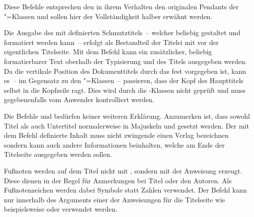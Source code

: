 \begin{Declaration}{}
\begin{Declaration}{}
\begin{Declaration}{}
\begin{Declaration}{}
\begin{Declaration}{}
\begin{Declaration}{}
\begin{Declaration}{}
\begin{Declaration}{}
\begin{Declaration}{}
\printdeclarationlist%
%
%
Diese Befehle entsprechen den in ihrem Verhalten den originalen Pendants der 
\KOMAScript"=Klassen{} und sollen hier der Vollständigkeit halber erwähnt 
werden.

Die Ausgabe des mit  definierten Schmutztitels~-- welcher 
beliebig gestaltet und formatiert werden kann~-- erfolgt als Bestandteil der 
Titelei mit  vor der eigentlichen Titelseite. Mit dem Befehl 
 kann ein zusätzlicher, beliebig formatierbarer Text oberhalb 
der Typisierung und des Titels ausgegeben werden. Da die vertikale Position des 
Dokumenttitels durch das \CD fest vorgegeben ist, kann es~-- im Gegensatz zu 
den \KOMAScript"=Klassen~-- passieren, dass der Kopf des Haupttitels selbst in 
die Kopfzeile ragt. Dies wird durch die \TUDScript-Klassen nicht geprüft und 
muss gegebenenfalls vom Anwender kontrolliert werden.

Die Befehle  und  bedürfen keiner weiteren 
Erklärung. Anzumerken ist, dass sowohl Titel als auch Untertitel normalerweise 
in Majuskeln und \DIN gesetzt werden. Der mit dem Befehl  
definierte Inhalt muss nicht zwingende einen Verlag bezeichnen sondern kann 
auch andere Informationen beinhalten, welche am Ende der Titelseite ausgegeben 
werden sollen.

Fußnoten werden auf dem Titel nicht mit , sondern mit der 
Anweisung  erzeugt. Diese dienen in der Regel für Anmerkungen bei 
Titel oder den Autoren. Als Fußnotenzeichen werden dabei Symbole statt Zahlen 
verwendet. Der Befehl  kann nur innerhalb des Arguments einer 
der Anweisungen für die Titelseite wie beispielsweise  oder 
 verwendet werden.


\end{Declaration}
\end{Declaration}
\end{Declaration}
\end{Declaration}
\end{Declaration}
\end{Declaration}
\end{Declaration}
\end{Declaration}
\end{Declaration}
